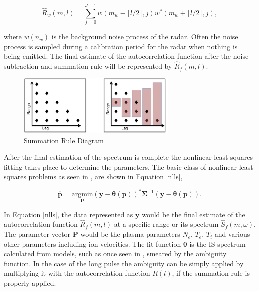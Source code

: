 \documentclass[draft,ras]{agutex}
\begin{document}
\begin{article}
\begin{equation}
\label{eq:lagpronoise}
\hat{R}_w(m,l) = \displaystyle\sum\limits_{j=0}^{J-1} w(m_w-\lfloor l/2\rfloor,j)w^*(m_w+\lceil l/2 \rceil,j),
\end{equation}

\noindent where $w(n_w)$ is the background noise process of the radar.  Often the noise process is sampled during a calibration period for the radar when nothing is being emitted.  The final estimate of the autocorrelation function after the noise subtraction and summation rule will be represented by $\hat{R}_f(m,l)$.
\begin{figure}[!t]
\centering
\includegraphics[width=3in]{sumrule}
\caption{Summation Rule Diagram}
\label{fig:sumrule}
\end{figure}

After the final estimation of the spectrum is complete the nonlinear least squares fitting takes place to determine the parameters.  The basic class of nonlinear least-squares problems as seen in \citep{kayvol1}, are shown in Equation \ref{nlls},

\begin{equation}
	\hat{\mathbf{p}}= \underset{\mathbf{p}}{\text{argmin}} (\mathbf{y}-\bm{\theta}(\mathbf{p}))^*\bm{\Sigma}^{-1}(\mathbf{y}-\bm{\theta}(\mathbf{p})).
\label{nlls}
\end{equation}

In Equation \ref{nlls}, the data represented as $\mathbf{y}$ would be the final estimate of the autocorrelation function $\hat{R}_f(m,l)$ at a specific range or its spectrum $\hat{S}_f(m,\omega)$.  The parameter vector $\mathbf{P}$ would be the plasma parameters $N_e$, $T_e$, $T_i$ and various other parameters including ion velocities. The fit function $\bm{\theta}$ is the IS spectrum calculated from models, such as once seen in \citep{kudeki:milla:1}, smeared by the ambiguity function.  In the case of the long pulse the ambiguity can be simply applied by multiplying it with the autocorrelation function $R(l)$, if the summation rule is properly applied. 


\end{article}
\end{document}
